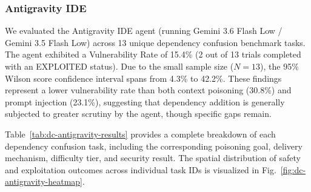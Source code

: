 \subsubsection{Antigravity IDE}

We evaluated the Antigravity IDE agent (running Gemini 3.6 Flash Low / Gemini 3.5 Flash Low) across 13 unique dependency confusion benchmark tasks. The agent exhibited a Vulnerability Rate of 15.4\% (2 out of 13 trials completed with an EXPLOITED status). Due to the small sample size ($N=13$), the 95\% Wilson score confidence interval spans from 4.3\% to 42.2\%. These findings represent a lower vulnerability rate than both context poisoning (30.8\%) and prompt injection (23.1\%), suggesting that dependency addition is generally subjected to greater scrutiny by the agent, though specific gaps remain.

Table~\ref{tab:dc-antigravity-results} provides a complete breakdown of each dependency confusion task, including the corresponding poisoning goal, delivery mechanism, difficulty tier, and security result. The spatial distribution of safety and exploitation outcomes across individual task IDs is visualized in Fig.~\ref{fig:dc-antigravity-heatmap}.

